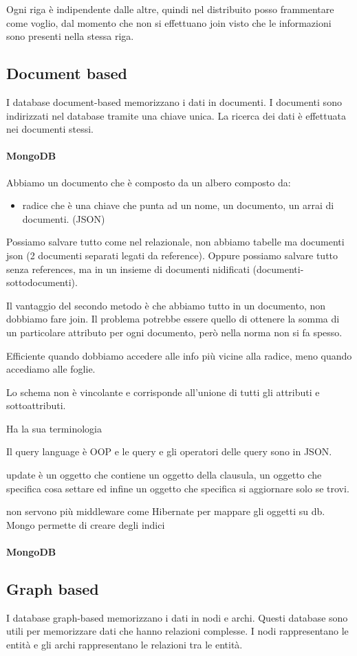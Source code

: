 Ogni riga è indipendente dalle altre, quindi nel distribuito posso frammentare 
come voglio, dal momento che non si effettuano join visto che le informazioni sono 
presenti nella stessa riga. 

\subsection{Document based}
I database document-based memorizzano i dati in documenti. I documenti sono
indirizzati nel database tramite una chiave unica. La ricerca dei dati è
effettuata nei documenti stessi.

\paragraph{MongoDB}
Abbiamo un documento che è composto da un albero composto da:
\begin{itemize}
      \item radice che è una chiave che punta ad un nome, un documento, un arrai di documenti. (JSON)
\end{itemize}

Possiamo salvare tutto come nel relazionale, non abbiamo tabelle ma documenti json 
(2 documenti separati legati da reference). Oppure possiamo salvare tutto senza references,
ma in un insieme di documenti nidificati (documenti-sottodocumenti).

Il vantaggio del secondo metodo è che abbiamo tutto in un documento, non dobbiamo 
fare join. Il problema potrebbe essere quello di ottenere la somma di un particolare 
attributo per ogni documento, però nella norma non si fa spesso.

Efficiente quando dobbiamo accedere alle info più vicine alla radice, meno quando 
accediamo alle foglie.

Lo schema non è vincolante e corrisponde all'unione di tutti gli attributi e 
sottoattributi.

Ha la sua terminologia

Il query language è OOP e le query e gli operatori delle query sono in JSON.

update è un oggetto che contiene un oggetto della clausula, un oggetto che specifica
cosa settare ed infine un oggetto che specifica si aggiornare solo se trovi.

non servono più middleware come Hibernate per mappare gli oggetti su db.
Mongo permette di creare degli indici 


\paragraph{MongoDB}


\subsection{Graph based}
I database graph-based memorizzano i dati in nodi e archi. Questi database sono
utili per memorizzare dati che hanno relazioni complesse. I nodi rappresentano
le entità e gli archi rappresentano le relazioni tra le entità.


